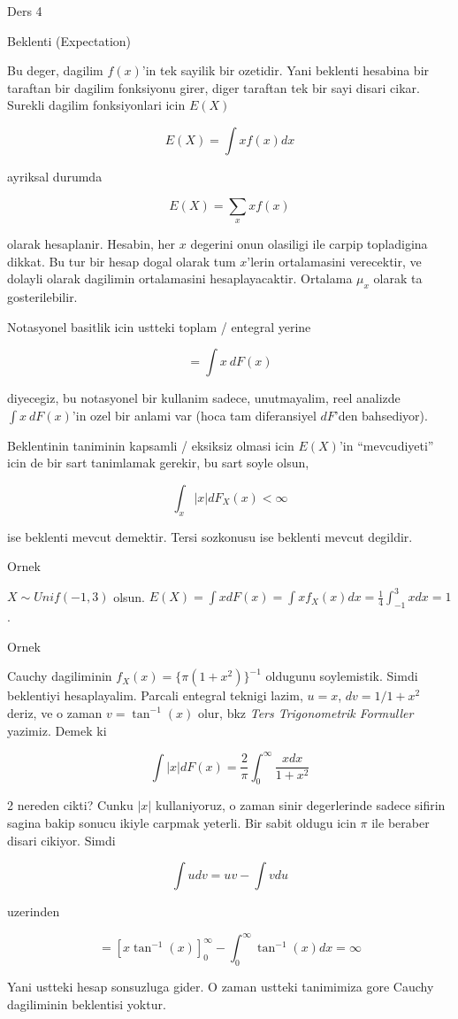\documentclass[12pt,fleqn]{article}\usepackage{../common}
\begin{document}
Ders 4

Beklenti (Expectation) 

Bu deger, dagilim $f(x)$'in tek sayilik bir ozetidir. Yani beklenti hesabina
bir taraftan bir dagilim fonksiyonu girer, diger taraftan tek bir sayi
disari cikar. Surekli dagilim fonksiyonlari icin $E(X)$

\[  E(X) = \int x f(x) dx\]

ayriksal durumda

\[ E(X) = \sum_x xf(x) \]

olarak hesaplanir. Hesabin, her $x$ degerini onun olasiligi ile carpip
topladigina dikkat. Bu tur bir hesap dogal olarak tum $x$'lerin
ortalamasini verecektir, ve dolayli olarak dagilimin ortalamasini
hesaplayacaktir. Ortalama $\mu_x$ olarak ta gosterilebilir.

Notasyonel basitlik icin ustteki toplam / entegral yerine 

\[ = \int x \ dF(x) \]

diyecegiz, bu notasyonel bir kullanim sadece, unutmayalim, reel analizde
$\int x \ dF(x)$'in ozel bir anlami var (hoca tam diferansiyel $dF$'den
bahsediyor). 

Beklentinin taniminin kapsamli / eksiksiz olmasi icin $E(X)$'in
``mevcudiyeti'' icin de bir sart tanimlamak gerekir, bu sart soyle olsun, 

\[ \int_x |x|dF_X(x) < \infty \]

ise beklenti mevcut demektir. Tersi sozkonusu ise beklenti mevcut
degildir. 


Ornek 

$X \sim Unif(-1,3)$ olsun. $E(X) = \int xdF(x) = \int x f_X(x)dx = \frac{
  1}{4} \int _{ -1}^{3} x dx = 1$. 

Ornek 

Cauchy dagiliminin $f_X(x) = \{ \pi (1+x^2) \} ^{-1}$ oldugunu soylemistik. Simdi 
beklentiyi hesaplayalim. Parcali entegral teknigi lazim, $u=x$, 
$dv =
1/1+x^2$ deriz, ve o zaman $v = \tan ^{-1}(x)$ olur, bkz {\em Ters
  Trigonometrik Formuller} yazimiz. Demek ki 

\[ \int |x|dF(x) = \frac{ 2}{\pi} \int _{ 0}^{\infty}\frac{x dx}{1+x^2}  \]

2 nereden cikti? Cunku $|x|$ kullaniyoruz, o zaman sinir degerlerinde
sadece sifirin sagina bakip sonucu ikiyle carpmak yeterli. Bir sabit oldugu
icin $\pi$ ile beraber disari cikiyor. Simdi

\[ \int udv = uv - \int vdu \]
 
uzerinden

\[ = [x \tan ^{-1}(x) ] _{ 0}^{\infty} - \int _{ 0}^{\infty} \tan ^{-1}(x)
dx  = \infty\]

Yani ustteki hesap sonsuzluga gider. O zaman ustteki tanimimiza gore Cauchy
dagiliminin beklentisi yoktur. 
\end{document}
